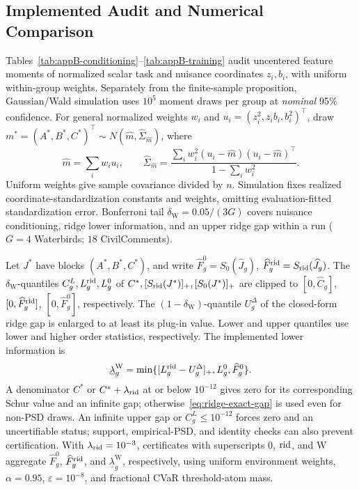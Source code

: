 \subsection{Implemented Audit and Numerical Comparison}
\label{app:implemented-audit}
Tables~\ref{tab:appB-conditioning}--\ref{tab:appB-training} audit uncentered feature moments of normalized scalar task and nuisance coordinates $z_i,b_i$, with uniform within-group weights. Separately from the finite-sample proposition, Gaussian/Wald simulation uses $10^5$ moment draws per group at \emph{nominal} 95\% confidence. For general normalized weights $w_i$ and $u_i=(z_i^2,z_ib_i,b_i^2)^\top$, draw $m^*=(A^*,B^*,C^*)^\top\sim N(\widehat m,\widehat\Sigma_{\widehat m})$, where
\begin{equation}
\widehat m=\sum_iw_iu_i,\qquad
\widehat\Sigma_{\widehat m}=
\frac{\sum_iw_i^2(u_i-\widehat m)(u_i-\widehat m)^\top}{1-\sum_iw_i^2}.
\label{eq:appB-wald-covariance}
\end{equation}
Uniform weights give sample covariance divided by $n$. Simulation fixes realized coordinate-standardization constants and weights, omitting evaluation-fitted standardization error. Bonferroni tail $\delta_{\mathrm W}=0.05/(3G)$ covers nuisance conditioning, ridge lower information, and an upper ridge gap within a run ($G=4$ Waterbirds; $18$ CivilComments).

Let $J^*$ have blocks $(A^*,B^*,C^*)$, and write $\widehat F_g^0=S_0(\widehat J_g)$, $\widehat F_g^{\mathrm{rid}}=S_{\mathrm{rid}}(\widehat J_g)$. The $\delta_{\mathrm W}$-quantiles $C_g^L,L_g^{\mathrm{rid}},L_g^0$ of $C^*,[S_{\mathrm{rid}}(J^*)]_+,[S_0(J^*)]_+$ are clipped to $[0,\widehat C_g]$, $[0,\widehat F_g^{\mathrm{rid}}]$, $[0,\widehat F_g^0]$, respectively. The $(1-\delta_{\mathrm W})$-quantile $U_g^\Delta$ of the closed-form ridge gap is enlarged to at least its plug-in value. Lower and upper quantiles use lower and higher order statistics, respectively. The implemented lower information is
\begin{equation}
\underline\lambda_g^{\mathrm W}
=\min\{[L_g^{\mathrm{rid}}-U_g^\Delta]_+,L_g^0,\widehat F_g^0\}.
\label{eq:appB-wald-lower}
\end{equation}
A denominator $C^*$ or $C^*+\lambda_{\mathrm{rid}}$ at or below $10^{-12}$ gives zero for its corresponding Schur value and an infinite gap; otherwise~\eqref{eq:ridge-exact-gap} is used even for non-PSD draws. An infinite upper gap or $C_g^L\le10^{-12}$ forces zero and an uncertifiable status; support, empirical-PSD, and identity checks can also prevent certification. With $\lambda_{\mathrm{rid}}=10^{-3}$, certificates with superscripts $0$, $\mathrm{rid}$, and $\mathrm W$ aggregate $\widehat F_g^0$, $\widehat F_g^{\mathrm{rid}}$, and $\underline\lambda_g^{\mathrm W}$, respectively, using uniform environment weights, $\alpha=0.95$, $\varepsilon=10^{-8}$, and fractional CVaR threshold-atom mass.

